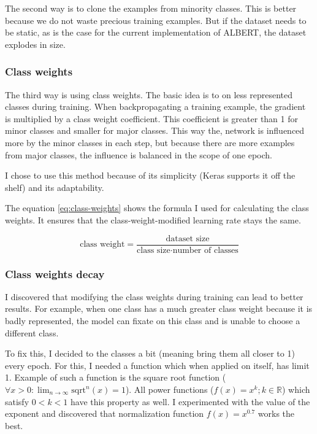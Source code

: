 \documentclass[
  printed, %
  color,   %
  table,   %
  oneside, %
  lof,     %
  lot,     %
]{fithesis3}
\begin{document}
The second way is to clone the examples from minority classes. This is better because we do not waste precious training examples. But if the dataset needs to be static, as is the case for the current implementation of ALBERT, the dataset explodes in size.

\subsubsection{Class weights}
\label{sec:class-weights}
The third way is using class weights\parencite{class-weights}. The basic idea is to  on less represented classes during training. When backpropagating a training example, the gradient is multiplied by a class weight coefficient. This coefficient is greater than 1 for minor classes and smaller for major classes. This way the, network is influenced more by the minor classes in each step, but because there are more examples from major classes, the influence is balanced in the scope of one epoch.

I chose to use this method because of its simplicity (Keras supports it off the shelf) and its adaptability.

The equation \ref{eq:class-weights} shows the formula I used for calculating the class weights. It ensures that the class-weight-modified learning rate stays the same.

\begin{equation}
\text{class weight} = \frac{\text{dataset size}}{\text{class size} \cdot \text{number of classes}} 
\label{eq:class-weights}
\end{equation}


\subsubsection{Class weights decay}
\label{sec:dynamic-class-weights}
I discovered that modifying the class weights during training can lead to better results. For example, when one class has a much greater class weight because it is badly represented, the model can fixate on this class and is unable to choose a different class.

To fix this, I decided to  the classes a bit (meaning bring them all closer to 1) every epoch. For this, I needed a function which when applied on itself, has limit 1. Example of such a function is the square root function ($\forall x>0: \lim_{n\to\infty} \text{sqrt}^n(x) = 1$). All power functions ($f(x) = x^k; k \in \mathbb{R}$) which satisfy $0 < k < 1$ have this property as well.
I experimented with the value of the exponent and discovered that normalization function $f(x) = x^{0.7}$ works the best.
\end{document}

